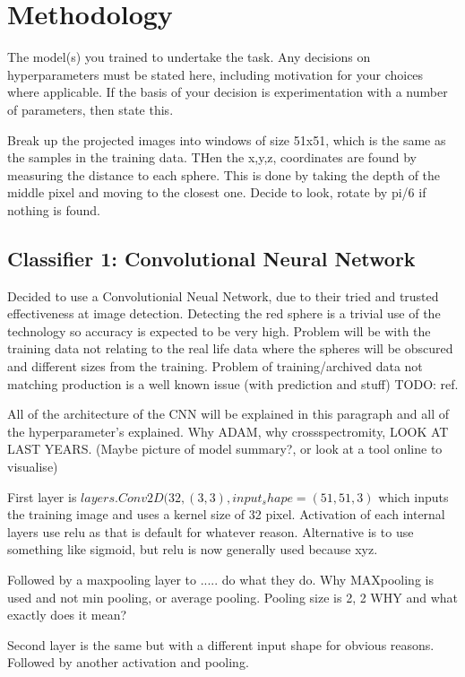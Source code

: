 \documentclass{article}
\begin{document}
\section{Methodology}
The model(s) you trained to undertake the task. Any decisions
on hyperparameters must be stated here, including motivation for your
choices where applicable. If the basis of your decision is experimentation
with a number of parameters, then state this.

Break up the projected images into windows of size 51x51, which is the same as the samples in the training data.
THen the x,y,z, coordinates are found by measuring the distance to each sphere.
This is done by taking the depth of the middle pixel and moving to the closest one.
Decide to look, rotate by pi/6 if nothing is found.

\subsection{Classifier 1: Convolutional Neural Network}

Decided to use a Convolutionial Neual Network, due to their tried and trusted effectiveness at image detection.
Detecting the red sphere is a trivial use of the technology so accuracy is expected to be very high.
Problem will be with the training data not relating to the real life data where the spheres will be obscured and different sizes from the training.
Problem of training/archived data not matching production is a well known issue (with prediction and stuff) TODO: ref.

All of the architecture of the CNN will be explained in this paragraph and all of the hyperparameter's explained.
Why ADAM, why crossspectromity, LOOK AT LAST YEARS.
(Maybe picture of model summary?, or look at a tool online to visualise)

First layer is 
$layers.Conv2D(32, (3, 3), input_shape=(51, 51, 3)$
which inputs the training image and uses a kernel size of 32 pixel.
Activation of each internal layers use relu as that is default for whatever reason.
Alternative is to use something like sigmoid, but relu is now generally used because xyz. 

Followed by a maxpooling layer to ..... do what they do.
Why MAXpooling is used and not min pooling, or average pooling.
Pooling size is 2, 2 WHY and what exactly does it mean?

Second layer is the same but with a different input shape for obvious reasons.
Followed by another activation and pooling.
\end{document}
